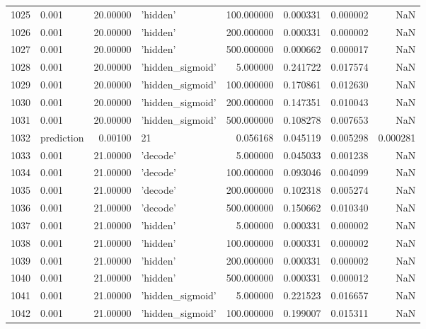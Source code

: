 \documentclass[10pt,a4paper]{article}
\begin{document}
\begin{tabular}{llrlrrrr}
1025 &       0.001 &  20.00000 &           'hidden' &  100.000000 &  0.000331 &  0.000002 &       NaN \\
1026 &       0.001 &  20.00000 &           'hidden' &  200.000000 &  0.000331 &  0.000002 &       NaN \\
1027 &       0.001 &  20.00000 &           'hidden' &  500.000000 &  0.000662 &  0.000017 &       NaN \\
1028 &       0.001 &  20.00000 &   'hidden\_sigmoid' &    5.000000 &  0.241722 &  0.017574 &       NaN \\
1029 &       0.001 &  20.00000 &   'hidden\_sigmoid' &  100.000000 &  0.170861 &  0.012630 &       NaN \\
1030 &       0.001 &  20.00000 &   'hidden\_sigmoid' &  200.000000 &  0.147351 &  0.010043 &       NaN \\
1031 &       0.001 &  20.00000 &   'hidden\_sigmoid' &  500.000000 &  0.108278 &  0.007653 &       NaN \\
1032 &  prediction &   0.00100 &                 21 &    0.056168 &  0.045119 &  0.005298 &  0.000281 \\
1033 &       0.001 &  21.00000 &           'decode' &    5.000000 &  0.045033 &  0.001238 &       NaN \\
1034 &       0.001 &  21.00000 &           'decode' &  100.000000 &  0.093046 &  0.004099 &       NaN \\
1035 &       0.001 &  21.00000 &           'decode' &  200.000000 &  0.102318 &  0.005274 &       NaN \\
1036 &       0.001 &  21.00000 &           'decode' &  500.000000 &  0.150662 &  0.010340 &       NaN \\
1037 &       0.001 &  21.00000 &           'hidden' &    5.000000 &  0.000331 &  0.000002 &       NaN \\
1038 &       0.001 &  21.00000 &           'hidden' &  100.000000 &  0.000331 &  0.000002 &       NaN \\
1039 &       0.001 &  21.00000 &           'hidden' &  200.000000 &  0.000331 &  0.000002 &       NaN \\
1040 &       0.001 &  21.00000 &           'hidden' &  500.000000 &  0.000331 &  0.000012 &       NaN \\
1041 &       0.001 &  21.00000 &   'hidden\_sigmoid' &    5.000000 &  0.221523 &  0.016657 &       NaN \\
1042 &       0.001 &  21.00000 &   'hidden\_sigmoid' &  100.000000 &  0.199007 &  0.015311 &       NaN \\

\end{tabular}
\end{document}
